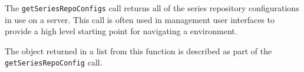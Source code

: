 The \verb+getSeriesRepoConfigs+ call returns all of the series repository configurations in use
on a \Rapture server. This call is often used in management user interfaces to provide a high level
starting point for navigating a \Rapture environment.

The object returned in a list from this function is described as part of the \verb+getSeriesRepoConfig+ call.
